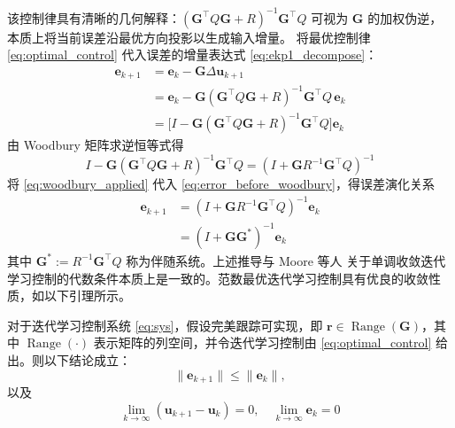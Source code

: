 该控制律具有清晰的几何解释：$(\mathbf{G}^\top Q \mathbf{G} + R)^{-1} \mathbf{G}^\top Q$ 可视为 $\mathbf{G}$ 的加权伪逆，本质上将当前误差沿最优方向投影以生成输入增量。
将最优控制律 \eqref{eq:optimal_control} 代入误差的增量表达式 \eqref{eq:ekp1_decompose}：
\begin{align}
	\mathbf{e}_{k+1} &= \mathbf{e}_k - \mathbf{G} \Delta\mathbf{u}_{k+1} \nonumber\\
	&= \mathbf{e}_k - \mathbf{G}(\mathbf{G}^\top Q \mathbf{G} + R)^{-1} \mathbf{G}^\top Q \,\mathbf{e}_k \nonumber\\
	&= \bigl[I - \mathbf{G}(\mathbf{G}^\top Q \mathbf{G} + R)^{-1} \mathbf{G}^\top Q\bigr] \mathbf{e}_k
	\label{eq:error_before_woodbury}
\end{align}
由 Woodbury 矩阵求逆恒等式得
\begin{equation}
	I - \mathbf{G}(\mathbf{G}^\top Q \mathbf{G} + R)^{-1} \mathbf{G}^\top Q = (I + \mathbf{G} R^{-1} \mathbf{G}^\top Q)^{-1}
	\label{eq:woodbury_applied}
\end{equation}
将 \eqref{eq:woodbury_applied} 代入 \eqref{eq:error_before_woodbury}，得误差演化关系
\begin{equation}
	\begin{aligned}
		\mathbf{e}_{k+1} &= (I + \mathbf{G} R^{-1} \mathbf{G}^\top Q)^{-1} \mathbf{e}_{k} \\
		&= (I + \mathbf{G} \mathbf{G}^*)^{-1} \mathbf{e}_{k}
	\end{aligned}
	\label{eq:error_evolution}
\end{equation}
其中 \(\mathbf{G}^* := R^{-1} \mathbf{G}^\top Q\) 称为伴随系统。上述推导与 Moore 等人 关于单调收敛迭代学习控制的代数条件本质上是一致的。范数最优迭代学习控制具有优良的收敛性质，如以下引理所示。

\begin{lemma}
	\label{propshoulian}
	对于迭代学习控制系统 \eqref{eq:sys}，假设完美跟踪可实现，即 \(\mathbf{r} \in \operatorname{Range}(\mathbf{G})\)，其中 \(\operatorname{Range}(\cdot)\) 表示矩阵的列空间，并令迭代学习控制由 \eqref{eq:optimal_control} 给出。则以下结论成立：
	\begin{equation}
		\|\mathbf{e}_{k+1}\| \leq \|\mathbf{e}_{k}\|,
		\label{eq:monotonic}
	\end{equation}
	以及
	\begin{equation}
		\lim_{k \to \infty} (\mathbf{u}_{k+1} - \mathbf{u}_{k}) = 0, \quad \lim_{k \to \infty} \mathbf{e}_{k} = 0
		\label{eq:converg}
	\end{equation}
\end{lemma}

